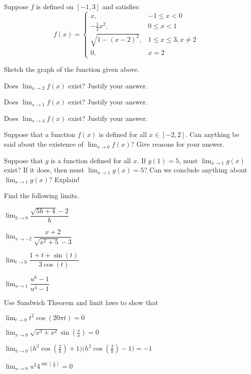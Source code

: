 \documentclass[unboxed]{hwset}
\begin{document}
\begin{problem}[1.] Suppose $f$ is defined on $[-1,3]$ and satisfies:
	\begin{equation*}
		f(x)=\begin{cases} x, &  -1 \leq x < 0 \\
			-\frac{1}{2}x^{2}, & 0 \leq x < 1 \\
    	\sqrt{1-(x-2)^{2}}, & 1 \leq x \leq 3, x \ne 2 \\
    	0, & x = 2
		\end{cases}
	\end{equation*}
	\be
		\item Sketch the graph of the function given above.
		\item Does $\lim_{x\to 2}f(x)$ exist? Justify your answer.
		\item Does $\lim_{x\to 1}f(x)$ exist? Justify your answer.
		\item Does $\lim_{x\to 4}f(x)$ exist? Justify your answer.
	\ee
\end{problem}

\begin{problem}[2.]
	\be
		\item Suppose that a function $f(x)$ is defined for all $x\in[-2,2]$. Can
		anything be said about the existence of $\lim_{x\to 0}f(x)$? Give reasons
		for your answer.
		\item Suppose that $g$ is a function defined for all $x$. If $g(1)=5$, must
		$\lim_{x\to1}g(x)$ exist? If it does, then must $ \lim_{x\to1}g(x)=5$? Can
		we conclude anything about $\lim_{x\to1}g(x)$? Explain!
	\ee
\end{problem}

\begin{problem}[3.] Find the following limits.
	\be
		\item $\lim_{h\to 0}\dfrac{\sqrt{5h+4}-2}{h}$
		\item $\lim_{x\to -2}\dfrac{x+2}{\sqrt{x^2+5}-3}$
		\item $\lim_{t\to 0}\dfrac{1+t+\sin(t)}{3\cos(t)}$
		\item $\lim_{u\to 1}\dfrac{u^{6}-1}{u^{4}-1}$
	\ee
\end{problem}

\begin{problem}[4.] Use Sandwich Theorem and limit laws to show that
	\be
		\item $\lim_{t\to 0}t^{2}\cos(20\pi t)=0$
		\item $\lim_{x\to 0}\sqrt{x^{3}+x^{2}}\sin({\frac{\pi}{x}})=0$
		\item $\lim_{h\to 0}\Big(h^{2}\cos(\frac{2}{h})+1\Big)\Big(h^{2}\cos(\frac{2}{h})-1\Big)=-1$
		\item $\lim_{u\to 0}u^{2}4^{\sin(\frac{\pi}{u})}=0$
	\ee
\end{problem}
\end{document}
